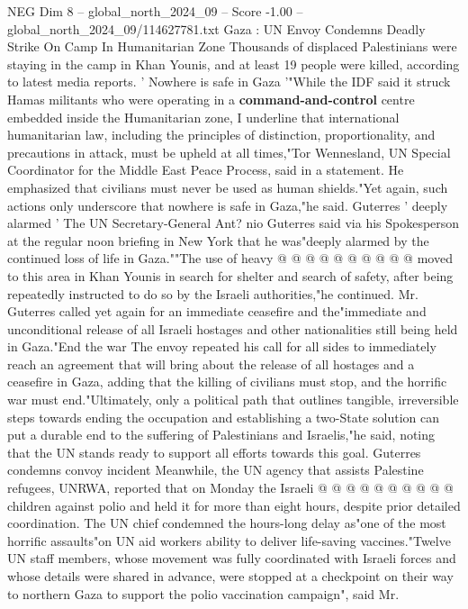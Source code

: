 \begin{textsample}{NEG Dim 8 – global\_north\_2024\_09 – Score -1.00 – global\_north\_2024\_09/114627781.txt}  \label{ex:f8_neg_149}
Gaza : UN Envoy Condemns Deadly Strike On Camp In Humanitarian Zone Thousands of displaced Palestinians were staying in the camp in Khan Younis, and at least 19 people were killed, according to latest media reports. ' Nowhere is safe in Gaza '"While the IDF said it struck Hamas militants who were operating in a \textbf{command-and-control} centre embedded inside the Humanitarian zone, I underline that international humanitarian law, including the principles of distinction, proportionality, and precautions in attack, must be upheld at all times,"Tor Wennesland, UN Special Coordinator for the Middle East Peace Process, said in a statement.
He emphasized that civilians must never be used as human shields."Yet again, such actions only underscore that nowhere is safe in Gaza,"he said.
Guterres ' deeply alarmed ' The UN Secretary-General Ant? nio Guterres said via his Spokesperson at the regular noon briefing in New York that he was"deeply alarmed by the continued loss of life in Gaza.""The use of heavy @ @ @ @ @ @ @ @ @ @ moved to this area in Khan Younis in search for shelter and search of safety, after being repeatedly instructed to do so by the Israeli authorities,"he continued.
Mr.
Guterres called yet again for an immediate ceasefire and the"immediate and unconditional release of all Israeli hostages and other nationalities still being held in Gaza."End the war The envoy repeated his call for all sides to immediately reach an agreement that will bring about the release of all hostages and a ceasefire in Gaza, adding that the killing of civilians must stop, and the horrific war must end."Ultimately, only a political path that outlines tangible, irreversible steps towards ending the occupation and establishing a two-State solution can put a durable end to the suffering of Palestinians and Israelis,"he said, noting that the UN stands ready to support all efforts towards this goal.
Guterres condemns convoy incident Meanwhile, the UN agency that assists Palestine refugees, UNRWA, reported that on Monday the Israeli @ @ @ @ @ @ @ @ @ @ children against polio and held it for more than eight hours, despite prior detailed coordination.
The UN chief condemned the hours-long delay as"one of the most horrific assaults"on UN aid workers ability to deliver life-saving vaccines."Twelve UN staff members, whose movement was fully coordinated with Israeli forces and whose details were shared in advance, were stopped at a checkpoint on their way to northern Gaza to support the polio vaccination campaign", said Mr.

\end{textsample}
